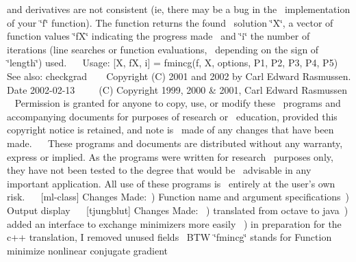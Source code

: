  and derivatives are not consistent (ie, there may be a bug in the~\newline
 implementation of your \char`\"{}f\char`\"{} function). The function returns the found~\newline
 solution \char`\"{}\+X\char`\"{}, a vector of function values \char`\"{}f\+X\char`\"{} indicating the progress made~\newline
 and \char`\"{}i\char`\"{} the number of iterations (line searches or function evaluations,~\newline
 depending on the sign of \char`\"{}length\char`\"{}) used.~\newline
 ~\newline
 Usage\+: \mbox{[}X, f\+X, i\mbox{]} = fmincg(f, X, options, P1, P2, P3, P4, P5)~\newline
 ~\newline
 See also\+: checkgrad ~\newline
 ~\newline
 Copyright (C) 2001 and 2002 by Carl Edward Rasmussen. Date 2002-\/02-\/13~\newline
 ~\newline
 ~\newline
 (C) Copyright 1999, 2000 \& 2001, Carl Edward Rasmussen ~\newline
 Permission is granted for anyone to copy, use, or modify these~\newline
 programs and accompanying documents for purposes of research or~\newline
 education, provided this copyright notice is retained, and note is~\newline
 made of any changes that have been made.~\newline
 ~\newline
 These programs and documents are distributed without any warranty,~\newline
 express or implied. As the programs were written for research~\newline
 purposes only, they have not been tested to the degree that would be~\newline
 advisable in any important application. All use of these programs is~\newline
 entirely at the user's own risk.~\newline
 ~\newline
 \mbox{[}ml-\/class\mbox{]} Changes Made\+:~) Function name and argument specifications~) Output display~\newline
 ~\newline
 \mbox{[}tjungblut\mbox{]} Changes Made\+: ~) translated from octave to java~) added an interface to exchange minimizers more easily ~) in preparation for the c++ translation, I removed unused fields~\newline
 B\+T\+W \char`\"{}fmincg\char`\"{} stands for Function minimize nonlinear conjugate gradient 

